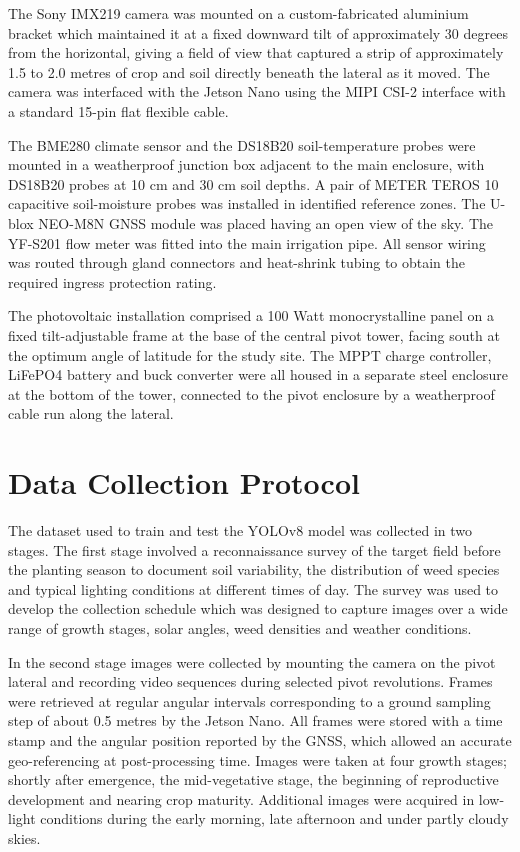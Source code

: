\documentclass[12pt,a4paper]{report}
\begin{document}
The Sony IMX219 camera was mounted on a custom-fabricated aluminium bracket which maintained it at a fixed downward tilt of approximately 30 degrees from the horizontal, giving a field of view that captured a strip of approximately 1.5 to 2.0 metres of crop and soil directly beneath the lateral as it moved. The camera was interfaced with the Jetson Nano using the MIPI CSI-2 interface with a standard 15-pin flat flexible cable.

The BME280 climate sensor and the DS18B20 soil-temperature probes were mounted in a weatherproof junction box adjacent to the main enclosure, with DS18B20 probes at 10 cm and 30 cm soil depths. A pair of METER TEROS 10 capacitive soil-moisture probes was installed in identified reference zones. The U-blox NEO-M8N GNSS module was placed having an open view of the sky. The YF-S201 flow meter was fitted into the main irrigation pipe. All sensor wiring was routed through gland connectors and heat-shrink tubing to obtain the required ingress protection rating.

The photovoltaic installation comprised a 100 Watt monocrystalline panel on a fixed tilt-adjustable frame at the base of the central pivot tower, facing south at the optimum angle of latitude for the study site. The MPPT charge controller, LiFePO4 battery and buck converter were all housed in a separate steel enclosure at the bottom of the tower, connected to the pivot enclosure by a weatherproof cable run along the lateral.

\section{Data Collection Protocol}

The dataset used to train and test the YOLOv8 model was collected in two stages. The first stage involved a reconnaissance survey of the target field before the planting season to document soil variability, the distribution of weed species and typical lighting conditions at different times of day. The survey was used to develop the collection schedule which was designed to capture images over a wide range of growth stages, solar angles, weed densities and weather conditions.

In the second stage images were collected by mounting the camera on the pivot lateral and recording video sequences during selected pivot revolutions. Frames were retrieved at regular angular intervals corresponding to a ground sampling step of about 0.5 metres by the Jetson Nano. All frames were stored with a time stamp and the angular position reported by the GNSS, which allowed an accurate geo-referencing at post-processing time. Images were taken at four growth stages; shortly after emergence, the mid-vegetative stage, the beginning of reproductive development and nearing crop maturity. Additional images were acquired in low-light conditions during the early morning, late afternoon and under partly cloudy skies.
\end{document}
